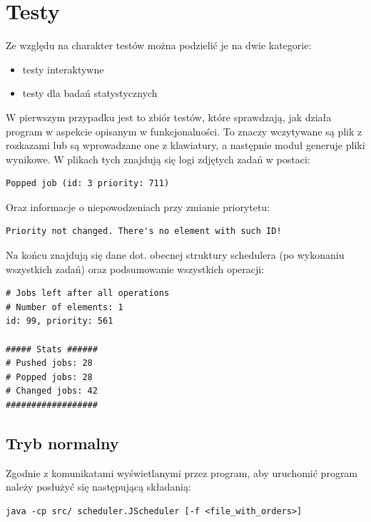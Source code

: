 \documentclass[12pt,a4paper]{article}
\begin{document}
\section{Testy}

Ze względu na charakter testów można podzielić je na dwie kategorie:

\begin{itemize}
	\item testy interaktywne
	\item testy dla badań statystycznych
\end{itemize}

W pierwszym przypadku jest to zbiór testów, które sprawdzają, jak działa program w aspekcie opisanym w funkcjonalności. To znaczy wczytywane są plik z rozkazami lub są wprowadzane one z klawiatury, a następnie moduł generuje pliki wynikowe. W plikach tych znajdują się logi zdjętych zadań w postaci:

\begin{lstlisting}
Popped job (id: 3 priority: 711)
\end{lstlisting}

Oraz informacje o niepowodzeniach przy zmianie priorytetu:

\begin{lstlisting}
Priority not changed. There's no element with such ID!
\end{lstlisting}

Na końcu znajdują się dane dot. obecnej struktury schedulera (po wykonaniu wszystkich zadań) oraz podsumowanie wszystkich operacji:

\begin{lstlisting}
# Jobs left after all operations
# Number of elements: 1
id: 99, priority: 561 

##### Stats ######
# Pushed jobs: 28
# Popped jobs: 28
# Changed jobs: 42
##################
\end{lstlisting}

\subsection{Tryb normalny}

Zgodnie z komunikatami wyświetlanymi przez program, aby uruchomić program należy posłużyć się następującą składanią:

\begin{lstlisting}[caption=Opis wywołania progamu]
java -cp src/ scheduler.JScheduler [-f <file_with_orders>]
\end{lstlisting}
\end{document}
